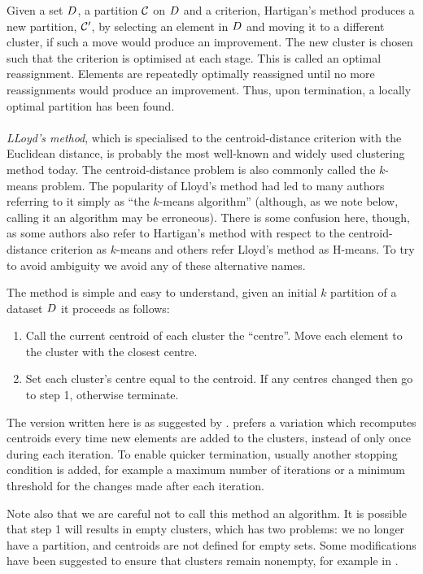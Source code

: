 Given a set $D$, a partition $\mathcal{C}$ on $D$ and a criterion,
Hartigan's method produces a new partition, $\mathcal{C}'$, by selecting an element
in $D$ and moving it to a different cluster, if such a move would produce
an improvement.  The new cluster is chosen such that the criterion is
optimised at each stage.  This is called an optimal reassignment.  Elements
are repeatedly optimally reassigned until no more reassignments would produce
an improvement.  Thus, upon termination, a locally optimal partition has been
found.
\\\\
\noindent \textit{LLoyd's method}, which is specialised to the
centroid-distance criterion with the Euclidean distance, is probably the most
well-known and widely used clustering method today.  The centroid-distance
problem is also commonly called the $k$-means problem.  The popularity of
Lloyd's method had led to many authors referring to it simply as ``the
$k$-means algorithm'' (although, as we note below, calling it an algorithm may
be erroneous).  There is some confusion here, though, as some authors also
refer to Hartigan's method with respect to the centroid-distance criterion as
$k$-means and others refer Lloyd's method as H-means.  To try to avoid
ambiguity we avoid any of these alternative names.

The method is simple and easy to understand, given an initial $k$ partition of
a dataset $D$ it proceeds as follows:
\begin{enumerate}
\item Call the current centroid of each cluster the ``centre''.  Move each
  element to the cluster with the closest centre.
\item Set each cluster's centre equal to the centroid.  If any centres changed
  then go to step 1, otherwise terminate.
\end{enumerate}

The version written here is as suggested by \citet{ballhall67clustering}.
\citet{macqueen1967some} prefers a variation which recomputes centroids every
time new elements are added to the clusters, instead of only once during each
iteration.  To enable quicker termination, usually another stopping condition
is added, for example a maximum number of iterations or a minimum threshold
for the changes made after each iteration.

Note also that we are careful not to call this method an algorithm.  It is
possible that step 1 will results in empty clusters, which has two problems:
we no longer have a partition, and centroids are not defined for empty sets.
Some modifications have been suggested to ensure that clusters remain
nonempty, for example in \citep{pakhira2009modified}.

